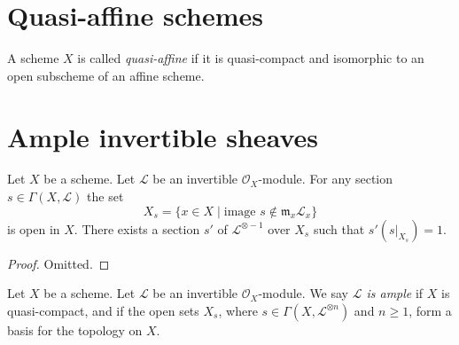 \section{Quasi-affine schemes}
\label{section-quasi-affine}




\begin{definition}
\label{definition-quasi-affine}
A scheme $X$ is called {\it quasi-affine} if it is quasi-compact
and isomorphic to an open subscheme of an affine scheme.
\end{definition}





\section{Ample invertible sheaves}
\label{section-ample}

\begin{lemma}
\label{lemma-s-open}
Let $X$ be a scheme.
Let $\mathcal{L}$ be an invertible $\mathcal{O}_X$-module.
For any section $s \in \Gamma(X, \mathcal{L})$ the set
$$
X_s = \{x \in X \mid \text{image }s \not\in \mathfrak m_x\mathcal{L}_x\}
$$
is open in $X$. There exists a section $s'$
of $\mathcal{L}^{\otimes -1}$ over $X_s$ such that $s' (s|_{X_s}) = 1$.
\end{lemma}

\begin{proof}
Omitted.
\end{proof}

\begin{definition}
\label{definition-ample}
Let $X$ be a scheme.
Let $\mathcal{L}$ be an invertible $\mathcal{O}_X$-module.
We say {\it $\mathcal{L}$ is ample} if $X$ is quasi-compact, and
if the open sets $X_s$, where $s \in \Gamma(X, \mathcal{L}^{\otimes n})$
and $n \geq 1$, form a basis for the topology on $X$.
\end{definition}















